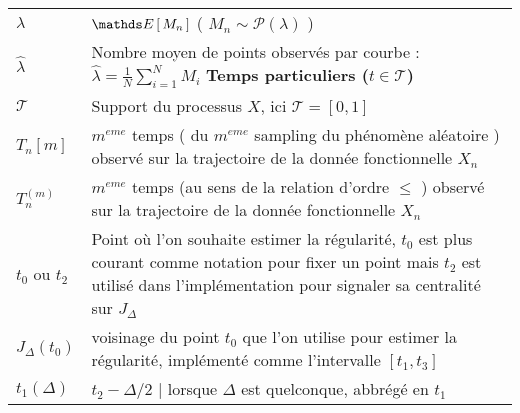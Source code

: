 \begin{table}[H]
\begin{tabularx}{\textwidth}{lX}
		\midrule
		$\lambda$                                        & $\esperance{M_n}$ ( $M_n \sim \mathcal P(\lambda)$ )                                                                                                                                                                                                    \\
		$\widehat \lambda$                               & Nombre moyen de points observés par courbe : $\widehat \lambda = \frac 1 N \sum\limits_{i=1}^N M_i$
		\midrule
		\textbf{Temps particuliers ($t \in \mathcal T$)} &                                                                                                                                                                                                                                                         \\
		\midrule
		$\mathcal T$                                     & Support du processus $X$, ici $\mathcal T = [0,1]$                                                                                                                                                                                                      \\
		$T_n[m]$                                         & $m^{eme}$ temps ( du $m^{eme}$ sampling du phénomène aléatoire ) observé sur la trajectoire de la donnée fonctionnelle $X_n$                                                                                                                            \\
		$T_n^{(m)}$                                      & $m^{eme}$ temps (au sens de la relation d'ordre $\leq$ ) observé sur la trajectoire de la donnée fonctionnelle $X_n$                                                                                                                                    \\
		$t_0$ ou $t_2$                                   & Point où l'on souhaite estimer la régularité, $t_0$ est plus courant comme notation pour fixer un point mais $t_2$ est utilisé dans l'implémentation pour signaler sa centralité sur $J_\Delta$                                                         \\
		$J_\Delta(t_0)$                                  & \og voisinage \fg du point $t_0$ que l'on utilise pour estimer la régularité, implémenté comme l'intervalle $[t_1, t_3]$                                                                                                                                \\
		$t_1(\Delta)$                                    & $t_2 - \Delta/2$ | lorsque $\Delta$ est quelconque, abbrégé en $t_1$                                                                                                                                                                                    \\

\end{tabularx}
\end{table}
